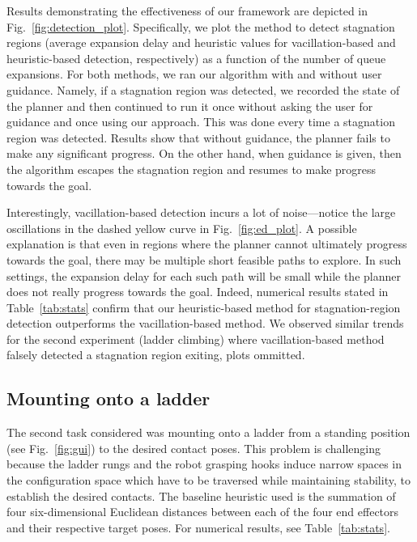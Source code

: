 \documentclass{article}
\begin{document}
Results demonstrating the effectiveness of our framework are depicted in Fig.~\ref{fig:detection_plot}.
Specifically, we plot the 
method to detect stagnation regions (average expansion delay and heuristic values for vacillation-based and heuristic-based detection, respectively) as a function of the number of queue expansions.
For both methods, we ran our algorithm with and without user guidance.
Namely, if a stagnation region was detected, we recorded the state of the planner and then continued to run it once without asking the user for guidance and once using our approach. This was done every time a stagnation region was detected. 
Results show that without guidance, the planner fails to make any significant progress.
On the other hand, when guidance is given, then the algorithm escapes the stagnation region and resumes to make progress towards the goal.

Interestingly, vacillation-based detection incurs a lot of noise---notice the large oscillations in the dashed yellow curve in Fig.~\ref{fig:ed_plot}. 
A possible explanation is that even in regions where the planner cannot ultimately progress towards the goal, there may be multiple short feasible paths to explore. In such settings, the expansion delay for each such path will be small while the planner does not really progress towards the goal.
Indeed, numerical results stated in Table~\ref{tab:stats} confirm that our heuristic-based method for stagnation-region detection outperforms the vacillation-based method.
We observed similar trends for the second experiment (ladder climbing) where vacillation-based method falsely detected a stagnation region exiting, plots ommitted.


\subsection{Mounting onto a ladder}
The second task considered was mounting onto a ladder from a standing position (see Fig.~\ref{fig:gui}) to the desired contact poses. This problem is challenging because the ladder rungs and the robot grasping hooks induce narrow spaces in the configuration space which have to be traversed while maintaining stability, to establish the desired contacts. The baseline heuristic  used is the summation of four six-dimensional Euclidean distances between each of the four end effectors and their respective target poses. 
For numerical results, see Table~\ref{tab:stats}.

\end{document}
